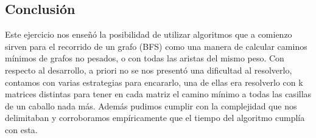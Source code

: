 \subsection{Conclusión}

Este ejercicio nos enseñó la posibilidad de utilizar algoritmos que a comienzo sirven para el recorrido de un grafo (BFS) como una manera de calcular caminos mínimos de grafos no pesados, o con todas las aristas del mismo peso. Con respecto al desarrollo, a priori no se nos presentó una dificultad al resolverlo, contamos con varias estrategias para encararlo, una de ellas era resolverlo con k matrices distintas para tener en cada matriz el camino mínimo a todas las casillas de un caballo nada más. Además pudimos cumplir con la complejidad que nos delimitaban y corroboramos empíricamente que el tiempo del algoritmo cumplía con esta.



